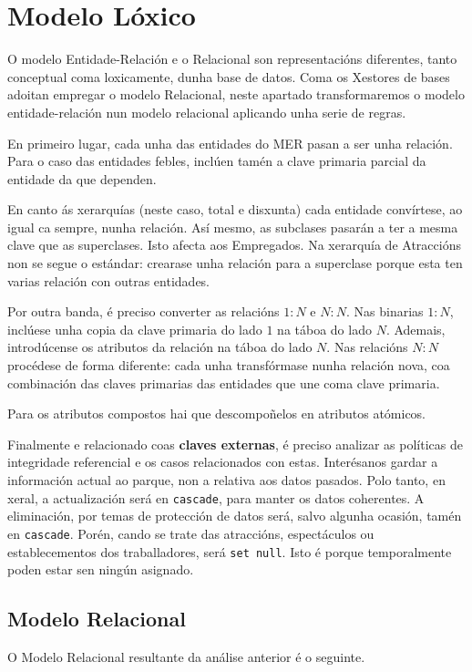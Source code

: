 \documentclass[12pt,a4paper]{book}
\theoremstyle{definition}
\theoremstyle{break}
\begin{document}
	\chapter{Modelo Lóxico}
	O modelo Entidade-Relación e o Relacional son representacións diferentes, tanto conceptual coma loxicamente, dunha base de datos. Coma os Xestores de bases adoitan empregar o modelo Relacional, neste apartado transformaremos o modelo entidade-relación nun modelo relacional aplicando unha serie de regras.
	
	En primeiro lugar, cada unha das entidades do MER pasan a ser unha relación. Para o caso das entidades febles, inclúen tamén a clave primaria parcial da entidade da que dependen.
	
	En canto ás xerarquías (neste caso, total e disxunta) cada entidade convírtese, ao igual ca sempre, nunha relación. Así mesmo, as subclases pasarán a ter a mesma clave que as superclases. Isto afecta aos Empregados. Na xerarquía de Atraccións non se segue o estándar: crearase unha relación para a superclase porque esta ten varias relación con outras entidades. 
	
	Por outra banda, é preciso converter as relacións $1:N$ e $N:N$. Nas binarias $1:N$, inclúese unha copia da clave primaria do lado $1$ na táboa do lado $N$. Ademais, introdúcense os atributos da relación na táboa do lado $N$. Nas relacións $N:N$ procédese de forma diferente: cada unha transfórmase nunha relación nova, coa combinación das claves primarias das entidades que une coma clave primaria.
	
	Para os atributos compostos hai que descompoñelos en atributos atómicos.
	
	Finalmente e relacionado coas \textbf{claves externas}, é preciso analizar as políticas de integridade referencial e os casos relacionados con estas. Interésanos gardar a información actual ao parque, non a relativa aos datos pasados. Polo tanto, en xeral, a actualización será en \texttt{cascade}, para manter os datos coherentes. A eliminación, por temas de protección de datos será, salvo algunha ocasión, tamén en \texttt{cascade}. Porén, cando se trate das atraccións, espectáculos ou establecementos dos traballadores, será \texttt{set null}. Isto é porque temporalmente poden estar sen ningún asignado.
	
	\newpage
	\section{Modelo Relacional}
	O Modelo Relacional resultante da análise anterior é o seguinte.
	
\end{document}
